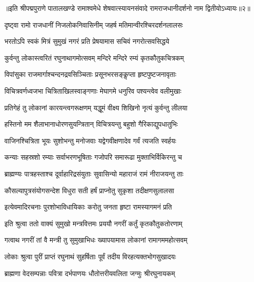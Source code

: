 {॥इति श्रीपद्मपुराणे पातालखण्डे रामाश्वमेधे शेषवात्स्यायनसंवादे रामराजधानीदर्शनो नाम द्वितीयोऽध्यायः॥२॥}



\twolineshloka
{दृष्ट्वा रामो राजधानीं निजलोकनिवासिनीम्}
{जहर्ष मतिमान्वीरश्चिरदर्शनलालसः}%

\twolineshloka
{भरतोऽपि स्वकं मित्रं सुमुखं नगरं प्रति}
{प्रेषयामास सचिवं नगरोत्सवसिद्धये}%


\twolineshloka
{कुर्वन्तु लोकास्त्वरितं रघुनाथागमोत्सवम्}
{मन्दिरे मन्दिरे रम्यं कृतकौतुकचित्रकम्}%

\twolineshloka
{विपांसुका राजमार्गाश्चन्दनद्रवसिञ्चिताः}
{प्रसूनभरसङ्कॢप्ता हृष्टपुष्टजनावृताः}%

\twolineshloka
{विचित्रवर्णध्वजभा चित्रिताखिलस्वाङ्गणाः}
{मेघागमे धनुरिव पश्यन्त्वेव वलीमुखाः}%

\twolineshloka
{प्रतिगेहं तु लोकानां कारयन्त्वगरूक्षणम्}
{यद्धूमं वीक्ष्य शिखिनो नृत्यं कुर्वन्तु लीलया}%

\twolineshloka
{हस्तिनो मम शैलाभानाधोरणसुयन्त्रितान्}
{विचित्रयन्तु बहुशो गैरिकाद्युपधातुभिः}%

\twolineshloka
{वाजिनश्चित्रिता भूयः सुशोभन्तु मनोजवाः}
{यद्वेगवीक्षणादेव गर्वं त्यजति स्वर्हयः}%

\twolineshloka
{कन्याः सहस्रशो रम्याः सर्वाभरणभूषिताः}
{गजोपरि समारूढा मुक्ताभिर्विकिरन्तु च}%

\twolineshloka
{ब्राह्मण्यः पात्रहस्ताश्च दूर्वाहारिद्रसंयुताः}
{सुवासिन्यो महाराजं रामं नीराजयन्तु ताः}%

\twolineshloka
{कौसल्यापुत्रसंयोगसन्देश विधुरा सती}
{हर्षं प्राप्नोतु सुकृशा तदीक्षणसुलालसा}%

\twolineshloka
{इत्येवमादिरचनाः पुरशोभाविधायिकाः}
{करोतु जनता हृष्टा रामस्यागमनं प्रति}%


\twolineshloka
{इति श्रुत्वा ततो वाक्यं सुमुखो मन्त्रवित्तमः}
{प्रययौ नगरीं कर्तुं कृतकौतुकतोरणाम्}%

\twolineshloka
{गत्वाथ नगरीं तां वै मन्त्री तु सुमुखाभिधः}
{ख्यापयामास लोकानां रामागममहोत्सवम्}%

\twolineshloka
{लोकाः श्रुत्वा पुरीं प्राप्तं रघुनाथं सुहर्षिताः}
{पूर्वं तदीय विरहत्यक्तभोगसुखादयः}%

\twolineshloka
{ब्राह्मणा वेदसम्पन्नाः पवित्रा दर्भपाणयः}
{धौतोत्तरीयवलिता जग्मुः श्रीरघुनायकम्}%

